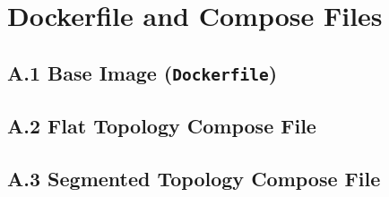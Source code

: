 \chapter{Dockerfile and Compose Files}
\label{ch:appendix-dockerfiles}

\section*{A.1 \quad Base Image (\texttt{Dockerfile})}


\section*{A.2 \quad Flat Topology Compose File}


\section*{A.3 \quad Segmented Topology Compose File}

